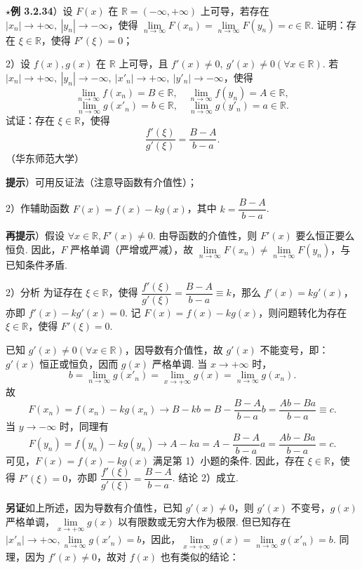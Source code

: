 \documentclass[UTF8, 12pt, fontset=fandol, oneside]{ctexart}
\begin{document}
\noindent\textbf{$\star$例 3.2.34}）设 $F(x)$ 在 $\mathbb{R}=(-\infty,+\infty)$ 上可导，若存在 $|x_n|\to+\infty,\ |y_n|\to-\infty$，使得 $\lim\limits_{n\to\infty}F(x_n)=\lim\limits_{n\to\infty}F(y_n)=c\in\mathbb{R}$. 证明：存在 $\xi\in\mathbb{R}$，使得 $F'(\xi)=0$；

2）设 $f(x),g(x)$ 在 $\mathbb{R}$ 上可导，且 $f'(x)\ne0,\ g'(x)\ne0(\forall x\in\mathbb{R})$. 若 $|x_n|\to+\infty,\ |y_n|\to-\infty,\ |x'_n|\to+\infty,\ |y'_n|\to-\infty$，使得
\[
  \lim_{n\to\infty}f(x_n)=B\in\mathbb{R},\quad
  \lim_{n\to\infty}f(y_n)=A\in\mathbb{R},
\]
\[
  \lim_{n\to\infty}g(x'_n)=b\in\mathbb{R},\quad
  \lim_{n\to\infty}g(y'_n)=a\in\mathbb{R}.
\]
试证：存在 $\xi\in\mathbb{R}$，使得
\[
  \frac{f'(\xi)}{g'(\xi)}=\frac{B-A}{b-a}.
\]
（华东师范大学）

\noindent\textbf{提示}）可用反证法（注意导函数有介值性）；

2）作辅助函数 $F(x)=f(x)-kg(x)$，其中 $k=\dfrac{B-A}{b-a}$.

\noindent\textbf{再提示}）假设 $\forall x\in\mathbb{R},F'(x)\ne0$. 由导函数的介值性，则 $F'(x)$ 要么恒正要么恒负. 因此，$F$ 严格单调（严增或严减），故 $\lim\limits_{n\to\infty}F(x_n)\ne\lim\limits_{n\to\infty}F(y_n)$，与已知条件矛盾.

2）分析 为证存在 $\xi\in\mathbb{R}$，使得 $\dfrac{f'(\xi)}{g'(\xi)}=\dfrac{B-A}{b-a}\equiv k$，那么 $f'(x)=kg'(x)$，亦即 $f'(x)-kg'(x)=0$. 记 $F(x)=f(x)-kg(x)$，则问题转化为存在 $\xi\in\mathbb{R}$，使得 $F'(\xi)=0$.

已知 $g'(x)\ne0(\forall x\in\mathbb{R})$，因导数有介值性，故 $g'(x)$ 不能变号，即：$g'(x)$ 恒正或恒负，因而 $g(x)$ 严格单调. 当 $x\to+\infty$ 时，
\[
  b=\lim_{n\to\infty}g(x'_n)=\lim_{x\to+\infty}g(x)=\lim_{n\to\infty}g(x_n).
\]
故
\[
  F(x_n)=f(x_n)-kg(x_n)\to B-kb
  =
  B-\frac{B-A}{b-a}b
  =
  \frac{Ab-Ba}{b-a}\equiv c.
\]
当 $y\to-\infty$ 时，同理有
\[
  F(y_n)=f(y_n)-kg(y_n)\to A-ka
  =
  A-\frac{B-A}{b-a}a
  =
  \frac{Ab-Ba}{b-a}=c.
\]
可见，$F(x)=f(x)-kg(x)$ 满足第 1）小题的条件. 因此，存在 $\xi\in\mathbb{R}$，使得 $F'(\xi)=0$，亦即 $\dfrac{f'(\xi)}{g'(\xi)}=\dfrac{B-A}{b-a}$. 结论 2）成立.

\noindent\textbf{另证}\quad 如上所述，因为导数有介值性，已知 $g'(x)\ne0$，则 $g'(x)$ 不变号，$g(x)$ 严格单调，$\lim\limits_{x\to+\infty}g(x)$ 以有限数或无穷大作为极限. 但已知存在 $|x'_n|\to+\infty,\lim\limits_{n\to\infty}g(x'_n)=b$，因此，$\lim\limits_{x\to+\infty}g(x)=\lim\limits_{n\to\infty}g(x'_n)=b$. 同理，因为 $f'(x)\ne0$，故对 $f(x)$ 也有类似的结论：
\end{document}
